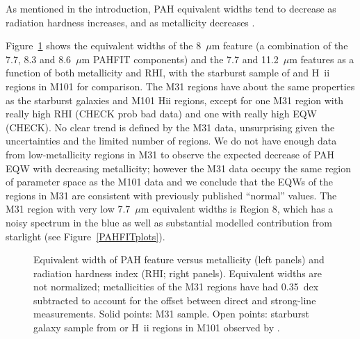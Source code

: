 As mentioned in the introduction, PAH equivalent widths tend to decrease as radiation hardness increases,
and as metallicity decreases \citep{Calzetti:2010fk}.  

Figure~\ref{rhi_met_eqw} shows the equivalent widths of the  8~$\mu$m feature 
(a combination of the 7.7, 8.3 and 8.6~$\mu$m PAHFIT components) and the 
 7.7 and 11.2~$\mu$m features as a function of both metallicity and RHI, with the starburst sample of \citet{Engelbracht_2008} 
and  H~{\sc ii} regions in M101 \citep{Gordon:2008lr} for comparison.
The M31 regions have about the same properties as the starburst galaxies and M101 H{\sc ii} regions, 
except for one M31 region with really high RHI (CHECK prob bad data) and one with really high EQW (CHECK). %
No clear trend is defined by the M31 data, unsurprising given the uncertainties and the limited
number  of regions.
We do not have enough data from low-metallicity regions in M31 to observe the expected decrease of PAH EQW with decreasing 
metallicity; however the M31 data occupy the same region of parameter space as the M101 data
and we conclude that the EQWs of the regions in M31 are consistent with previously published ``normal'' values.
The M31 region with very low  7.7~$\mu$m  equivalent widths is Region 8, which has
a noisy spectrum in the blue as well as substantial modelled contribution from starlight (see Figure~\ref{PAHFITplots}).


\begin{figure}
\centering
\caption{Equivalent width of  PAH feature versus metallicity (left panels) and radiation hardness index (RHI; right panels).
Equivalent  widths are not normalized; metallicities of the M31 regions have had 0.35~dex subtracted to account for the offset  between direct and strong-line measurements. 
Solid points: M31 sample. Open points:  starburst galaxy sample from \citet[bottom panels]{Engelbracht_2008} or
 H~{\sc ii} regions in M101 observed  by \citet[middle and top panels]{Gordon:2008lr}.  
}
\label{rhi_met_eqw}
\end{figure}




